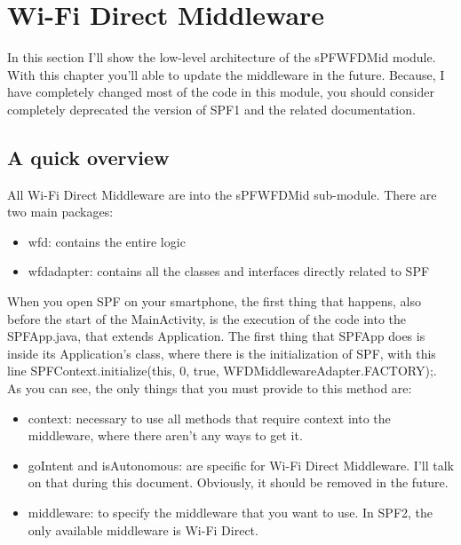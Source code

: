 \chapter{Wi-Fi Direct Middleware}
\label{chap2}
\thispagestyle{empty}

\noindent In this section I'll show the low-level architecture of the sPFWFDMid module. With this chapter you'll able to update the middleware in the future. Because, I have completely changed most of the code in this module, you should consider completely deprecated the version of SPF1 and the related documentation.

\section{A quick overview}

All Wi-Fi Direct Middleware are into the sPFWFDMid sub-module. There are two main packages:

\begin{itemize}
	\item wfd: contains the entire logic 
	\item wfdadapter: contains all the classes and interfaces directly related to SPF
\end{itemize}

When you open SPF on your smartphone, the first thing that happens, also before the start of the MainActivity, is the execution of the code into the SPFApp.java, that extends Application. 
The first thing that SPFApp does is inside its Application's class, where there is the initialization of SPF, with this line \textsf{SPFContext.initialize(this, 0, true, WFDMiddlewareAdapter.FACTORY);}. As you can see, the only things that you must provide to this method are:
\begin{itemize}
	\item \textsf{context}: necessary to use all methods that require context into the middleware, where there aren't any ways to get it.
	\item \textsf{goIntent} and \textsf{isAutonomous}: are specific for Wi-Fi Direct Middleware. I'll talk on that during this document. Obviously, it should be removed in the future.
	\item \textsf{middleware}: to specify the middleware that you want to use. In SPF2, the only available middleware is Wi-Fi Direct.
\end{itemize}


